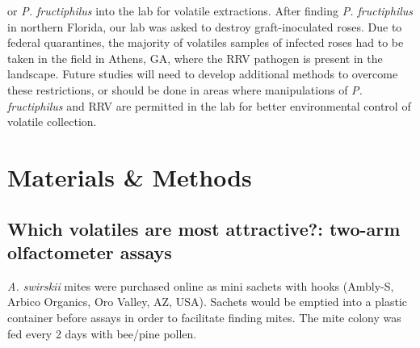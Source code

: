 \documentclass{ufdissertation}[overrideChapters] %
\begin{document}
{or \emph{P. fructiphilus} into the lab for volatile extractions. After finding \emph{P. fructiphilus} in northern Florida, our lab was asked to destroy graft-inoculated roses. Due to federal quarantines, the majority of volatiles samples of infected roses had to be taken in the field in Athens, GA, where the RRV pathogen is present in the landscape. Future studies will need to develop additional methods to overcome these restrictions, or should be done in areas where manipulations of \emph{P. fructiphilus} and RRV are permitted in the lab for better environmental control of volatile collection.

\hypertarget{materials-methods-1}{%
\section{Materials \& Methods}\label{materials-methods-1}}

\hypertarget{which-volatiles-are-most-attractive-two-arm-olfactometer-assays}{%
\subsection{Which volatiles are most attractive?: two-arm olfactometer assays}\label{which-volatiles-are-most-attractive-two-arm-olfactometer-assays}}

\emph{A. swirskii} mites were purchased online as mini sachets with hooks (Ambly-S, Arbico Organics, Oro Valley, AZ, USA). Sachets would be emptied into a plastic container before assays in order to facilitate finding mites. The mite colony was fed every 2 days with bee/pine pollen.

}
\end{document}
